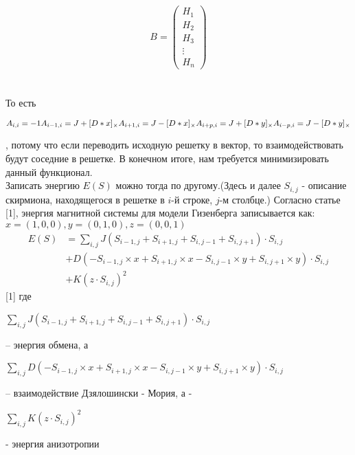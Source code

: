 \documentclass[ 12pt,x11names]{article}
\begin{document}
     \begin{equation*}
    B = \left(
    \begin{array}{c}
    H_1\\
    H_2\\
    H_3\\
    \vdots\\
    H_n
    \end{array}
    \right)
 \label{eq:ref}
    \end{equation*}\\
    \\
    То есть  \begin{center} $A_{i, i} = -1 \\ A_{i - 1, i} =  J + [D*x]_\times \\
    A_{i+1, i} =  J - [D*x]_\times \\
    A_{i + p, i} =  J + [D*y]_\times \\
    A_{i - p , i} =  J -  [D*y]_\times$
     \end{center}, потому что если переводить исходную решетку в вектор, то взаимодействовать будут соседние в решетке.
    В конечном итоге, нам требуется минимизировать данный функционал.\\
    Записать энергию $E(S)$ можно тогда по другому.(Здесь и далее $S_{i,j}$ - описание скирмиона, находящегося в решетке в $i$-й строке, $j$-м столбце.)
    Согласно статье [1], энергия магнитной системы для модели Гизенберга записывается как:\\
    $x = (1,0, 0), y = (0,1, 0), z =(0, 0 , 1)$\\
    \begin{equation}
    \label{eq:pareto mle2}
    \begin{split}
    E(S) &= \displaystyle{\sum_{i, j}}  J (S_{i - 1, j} + S_{i + 1, j} + S_{i, j - 1} + S_{i, j + 1}) \cdot S_{i,j} \\
    &+ D(-S_{i - 1, j} \times x  + S_{i + 1, j} \times x - S_{i, j - 1} \times y + S_{i, j + 1} \times y)\cdot S_{i,j}
     \\
    &+ K  (z \cdot S_{i,j}) ^ 2
    \end{split}
    \end{equation}[1]
    где
     \begin{center}
    $\displaystyle{\sum_{i, j}} J (S_{i - 1, j} + S_{i + 1, j} + S_{i, j - 1} + S_{i, j + 1}) \cdot S_{i,j}$\end{center} -- энергия обмена, а \begin{center}
    $\displaystyle{\sum_{i, j}} D  (-S_{i - 1, j} \times x  + S_{i + 1, j} \times x - S_{i, j - 1} \times y + S_{i, j + 1} \times y)\cdot S_{i,j}$\end{center}  -- взаимодействие Дзялошински - Мория, а - \begin{center}
    $\displaystyle{\sum_{i, j}} K  (z \cdot S_{i,j}) ^ 2$\end{center} - энергия анизотропии\\
\end{document}
